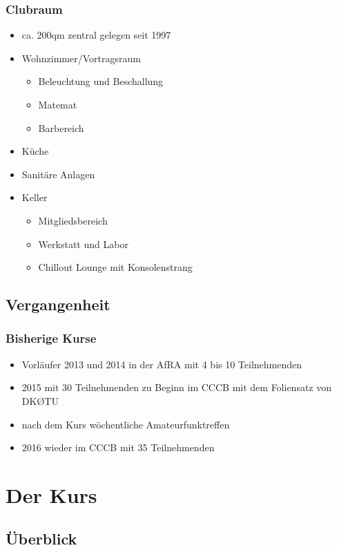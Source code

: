 \begin{frame}
  \frametitle{Clubraum}

  \begin{itemize}
    \item ca. 200qm zentral gelegen seit 1997
    \item Wohnzimmer/Vortragsraum
      \begin{itemize}
        \item Beleuchtung und Beschallung
        \item Matemat
        \item Barbereich
      \end{itemize}
    \item Küche
    \item Sanitäre Anlagen
    \item Keller
      \begin{itemize}
        \item Mitgliedsbereich
        \item Werkstatt und Labor
        \item Chillout Lounge mit Konsolenstrang
      \end{itemize}
  \end{itemize}
\end{frame}

\subsection{Vergangenheit}
\begin{frame}
  \frametitle{Bisherige Kurse}

  \begin{itemize}
    \item Vorläufer 2013 und 2014 in der AfRA mit 4 bis 10 Teilnehmenden
    \item 2015 mit 30 Teilnehmenden zu Beginn im CCCB mit dem Foliensatz von DK\O TU
    \item nach dem Kurs wöchentliche Amateurfunktreffen
    \item 2016 wieder im CCCB mit 35 Teilnehmenden
  \end{itemize}
\end{frame}


\section{Der Kurs}
\subsection{Überblick}

